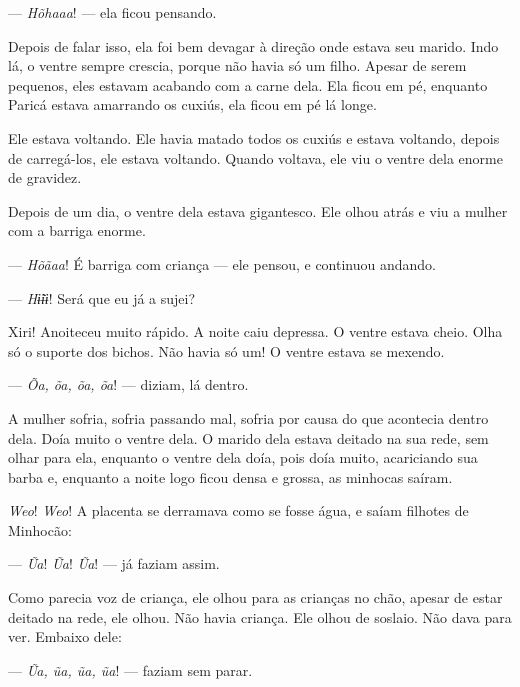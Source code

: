 --- \textit{Hõhaaa}! --- ela ficou pensando.

Depois de falar isso, ela foi bem devagar à direção onde estava seu
marido. Indo lá, o ventre sempre crescia, porque não havia só um filho.
Apesar de serem pequenos, eles estavam acabando com a carne dela. Ela
ficou em pé, enquanto Paricá estava amarrando os cuxiús, ela ficou em pé
lá longe. 

Ele estava voltando. Ele havia matado todos os cuxiús e estava voltando,
depois de carregá-los, ele estava voltando. Quando voltava, ele viu o
ventre dela enorme de gravidez. 



Depois de um dia, o ventre dela estava gigantesco. Ele olhou atrás e viu
a mulher com a barriga enorme. 

--- \textit{Hõãaa}! É barriga com criança --- ele pensou, e continuou andando. 

--- \textit{Hɨ̃ɨɨ}! Será que eu já a sujei?

Xiri! Anoiteceu muito rápido. A noite caiu depressa. O ventre estava
cheio. Olha só o suporte dos bichos. Não havia só um! O ventre estava se
mexendo. 

--- \textit{Õa, õa, õa, õa}! --- diziam, lá dentro. 

A mulher sofria, sofria passando mal, sofria por causa do que acontecia
dentro dela. Doía muito o ventre dela. O marido dela estava deitado na
sua rede, sem olhar para ela, enquanto o ventre dela doía, pois doía
muito, acariciando sua barba e, enquanto a noite logo ficou densa e
grossa, as minhocas saíram.

\textit{Weo}! \textit{Weo}! A placenta se derramava como se fosse água, e saíam filhotes de
Minhocão:

--- \textit{Ũa}! \textit{Ũa}! \textit{Ũa}! --- já faziam assim. 

Como parecia voz de criança, ele olhou para as crianças no chão, apesar
de estar deitado na rede, ele olhou. Não havia criança. Ele olhou de
soslaio. Não dava para ver. Embaixo dele:

--- \textit{Ũa, ũa, ũa, ũa}! --- faziam sem parar. 

